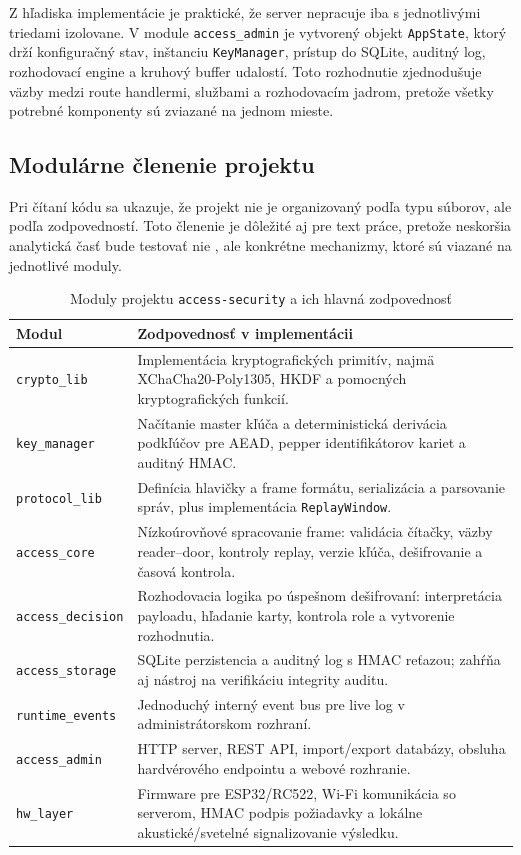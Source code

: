 \documentclass[journal,a4paper,onecolumn]{IEEEtran}
\begin{document}
Z hľadiska implementácie je praktické, že server nepracuje iba s jednotlivými triedami izolovane. V module \texttt{access\_admin} je vytvorený objekt \texttt{AppState}, ktorý drží konfiguračný stav, inštanciu \texttt{KeyManager}, prístup do SQLite, auditný log, rozhodovací engine a kruhový buffer udalostí. Toto rozhodnutie zjednodušuje väzby medzi route handlermi, službami a rozhodovacím jadrom, pretože všetky potrebné komponenty sú zviazané na jednom mieste.

\subsection{Modulárne členenie projektu}

Pri čítaní kódu sa ukazuje, že projekt nie je organizovaný podľa typu súborov, ale podľa zodpovedností. Toto členenie je dôležité aj pre text práce, pretože neskoršia analytická časť bude testovať nie , ale konkrétne mechanizmy, ktoré sú viazané na jednotlivé moduly.

\begin{table}[h]
\centering
\caption{Moduly projektu \texttt{access-security} a ich hlavná zodpovednosť}
\begin{tabular}{|p{3.2cm}|p{8.8cm}|}
\hline
\textbf{Modul} & \textbf{Zodpovednosť v implementácii} \\
\hline
\texttt{crypto\_lib} & Implementácia kryptografických primitív, najmä XChaCha20-Poly1305, HKDF a pomocných kryptografických funkcií. \\
\hline
\texttt{key\_manager} & Načítanie master kľúča a deterministická derivácia podkľúčov pre AEAD, pepper identifikátorov kariet a auditný HMAC. \\
\hline
\texttt{protocol\_lib} & Definícia hlavičky a frame formátu, serializácia a parsovanie správ, plus implementácia \texttt{ReplayWindow}. \\
\hline
\texttt{access\_core} & Nízkoúrovňové spracovanie frame: validácia čítačky, väzby reader--door, kontroly replay, verzie kľúča, dešifrovanie a časová kontrola. \\
\hline
\texttt{access\_decision} & Rozhodovacia logika po úspešnom dešifrovaní: interpretácia payloadu, hľadanie karty, kontrola role a vytvorenie rozhodnutia. \\
\hline
\texttt{access\_storage} & SQLite perzistencia a auditný log s HMAC reťazou; zahŕňa aj nástroj na verifikáciu integrity auditu. \\
\hline
\texttt{runtime\_events} & Jednoduchý interný event bus pre live log v administrátorskom rozhraní. \\
\hline
\texttt{access\_admin} & HTTP server, REST API, import/export databázy, obsluha hardvérového endpointu a webové rozhranie. \\
\hline
\texttt{hw\_layer} & Firmware pre ESP32/RC522, Wi-Fi komunikácia so serverom, HMAC podpis požiadavky a lokálne akustické/svetelné signalizovanie výsledku. \\
\hline
\end{tabular}
\end{table}
\end{document}
